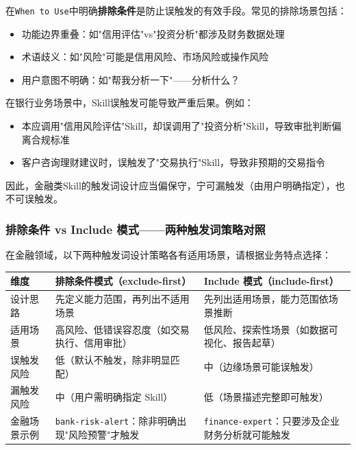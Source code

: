 在\texttt{When to Use}中明确\textbf{排除条件}是防止误触发的有效手段。常见的排除场景包括：
\begin{itemize}[leftmargin=2em]
  \item 功能边界重叠：如"信用评估"vs"投资分析"都涉及财务数据处理
  \item 术语歧义：如"风险"可能是信用风险、市场风险或操作风险
  \item 用户意图不明确：如"帮我分析一下"——分析什么？
\end{itemize}

\begin{warningbox}[误触发的真实风险]
在银行业务场景中，Skill误触发可能导致严重后果。例如：
\begin{itemize}[leftmargin=1em]
  \item 本应调用"信用风险评估"Skill，却误调用了"投资分析"Skill，导致审批判断偏离合规标准
  \item 客户咨询理财建议时，误触发了"交易执行"Skill，导致非预期的交易指令
\end{itemize}
因此，金融类Skill的触发词设计应当偏保守，宁可漏触发（由用户明确指定），也不可误触发。
\end{warningbox}

\subsubsection{排除条件 vs Include 模式——两种触发词策略对照}

在金融领域，以下两种触发词设计策略各有适用场景，请根据业务特点选择：

\begin{table}[H]
\centering
\begin{tabular}{p{3.5cm}p{5cm}p{5cm}}
\toprule
\textbf{维度} & \textbf{排除条件模式（exclude-first）} & \textbf{Include 模式（include-first）} \\
\midrule
设计思路 & 先定义能力范围，再列出不适用场景 & 先列出适用场景，能力范围依场景推断 \\
适用场景 & 高风险、低错误容忍度（如交易执行、信用审批） & 低风险、探索性场景（如数据可视化、报告起草） \\
误触发风险 & 低（默认不触发，除非明显匹配） & 中（边缘场景可能误触发） \\
漏触发风险 & 中（用户需明确指定 Skill） & 低（场景描述完整即可触发） \\
金融场景示例 & \texttt{bank-risk-alert}：除非明确出现"风险预警"才触发 & \texttt{finance-expert}：只要涉及企业财务分析就可能触发 \\
\bottomrule
\end{tabular}
\end{table}

